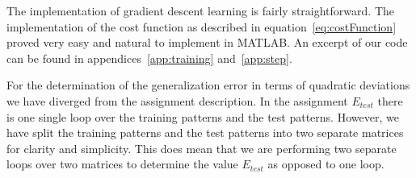 The implementation of gradient descent learning is fairly straightforward. 
The implementation of the cost function as described in equation~\ref{eq:costFunction} proved very easy and natural to implement in MATLAB.
An excerpt of our code can be found in appendices~\ref{app:training} and~\ref{app:step}.

For the determination of the generalization error in terms of quadratic deviations we have diverged from the assignment description. 
In the assignment \(E_{test}\) there is one single loop over the training patterns and the test patterns. 
However, we have split the training patterns and the test patterns into two separate matrices for clarity and simplicity. 
This does mean that we are performing two separate loops over two matrices to determine the value \(E_{test}\) as opposed to one loop.
